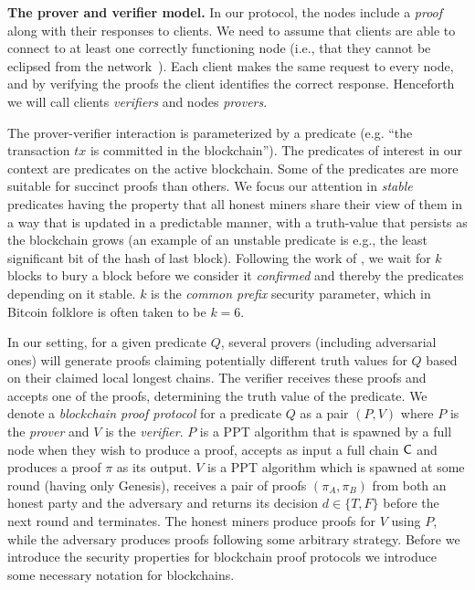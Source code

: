 \noindent
\textbf{The prover and verifier model.}
In our protocol, the nodes include a \emph{proof} along with their responses to
clients. We need to assume that clients are able to connect to at least one
correctly functioning node (i.e., that they cannot be eclipsed from the
network~\cite{eclipse,hijackingbitcoin}). Each client makes the same
request to every node, and by verifying the proofs the client identifies the
correct response. Henceforth we will call clients \emph{verifiers} and nodes
\emph{provers}.

The prover-verifier interaction is parameterized by a predicate (e.g. ``the
transaction $tx$ is committed in the blockchain'').
%
The predicates of interest in our context are predicates on the active
blockchain. Some of the predicates are more suitable for succinct proofs than
others. We focus our attention in \emph{stable} predicates having the property
that all honest miners share their view of them in a way that is updated in a
predictable manner, with a truth-value that persists as the blockchain grows (an
example of an unstable predicate is e.g., the least significant bit of the hash
of last block). Following the work of \cite{backbone}, we wait for $k$ blocks to
bury a block before we consider it \emph{confirmed} and thereby the predicates
depending on it stable. $k$ is the \emph{common prefix} security parameter,
which in Bitcoin folklore is often taken to be $k = 6$.

In our setting, for a given predicate $Q$, several  provers (including
adversarial ones) will generate proofs claiming potentially different truth
values for $Q$ based on their claimed local longest chains. The verifier
receives these proofs and accepts one of the proofs, determining the truth value
of the predicate.  We denote a  \emph{blockchain proof protocol} for a
predicate $Q$ as a pair $(P, V)$ where $P$ is the \emph{prover} and $V$ is the
\emph{verifier}. $P$ is a PPT algorithm that is spawned by a full node when
they wish to produce a proof, accepts as input a full chain $\mathsf{C}$ and
produces a proof $\pi$ as its output. $V$ is a PPT algorithm which is spawned at
some round (having only Genesis), receives a pair of proofs $(\pi_A, \pi_B)$
from both an honest party and the adversary and returns its decision $d \in \{T,
F\}$ before the next round and terminates. The honest miners produce proofs for
$V$ using $P$, while the adversary produces proofs following some arbitrary
strategy. Before we introduce the security properties for blockchain proof
protocols we introduce some necessary notation for blockchains.

